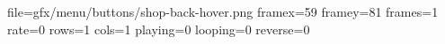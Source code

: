 file=gfx/menu/buttons/shop-back-hover.png
framex=59
framey=81
frames=1
rate=0
rows=1
cols=1
playing=0
looping=0
reverse=0